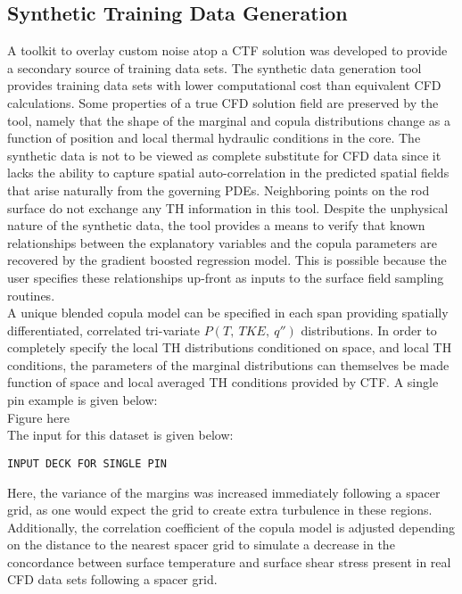 \subsection{Synthetic Training Data Generation}

A toolkit to overlay custom noise atop a CTF solution was developed to provide a secondary source of training data sets.  The synthetic data generation tool provides training data sets with lower computational cost than equivalent CFD calculations.  Some properties of a true CFD solution field are preserved by the tool, namely that the shape of the marginal and copula distributions change as a function of position and local thermal hydraulic conditions in the core.  The synthetic data is not to be viewed as complete substitute for CFD data since it lacks the ability to capture spatial auto-correlation in the predicted spatial fields that arise naturally from the governing PDEs.  Neighboring points on the rod surface do not exchange any TH information in this tool.  Despite the unphysical nature of the synthetic data, the tool provides a means to verify that known relationships between the explanatory variables and the copula parameters are recovered by the gradient boosted regression model.  This is possible because the user specifies these relationships up-front as inputs to the surface field sampling routines. \\

A unique blended copula model can be specified in each span providing spatially differentiated, correlated tri-variate $P(T,\ TKE,\ q'')$  distributions.
In order to completely specify the local TH distributions conditioned on space, and local TH conditions, the parameters of the marginal distributions can themselves be made function of space and local averaged TH conditions provided by CTF.  A single pin example is given below: \\

Figure here \\

The input for this dataset is given below:

\begin{verbatim}
INPUT DECK FOR SINGLE PIN
\end{verbatim}

Here, the variance of the margins was increased immediately following a spacer grid, as one would expect the grid to create extra turbulence in these regions.  Additionally, the correlation coefficient of the copula model is adjusted depending on the distance to the nearest spacer grid to simulate a decrease in the concordance between surface temperature and surface shear stress present in real CFD data sets following a spacer grid. \\

